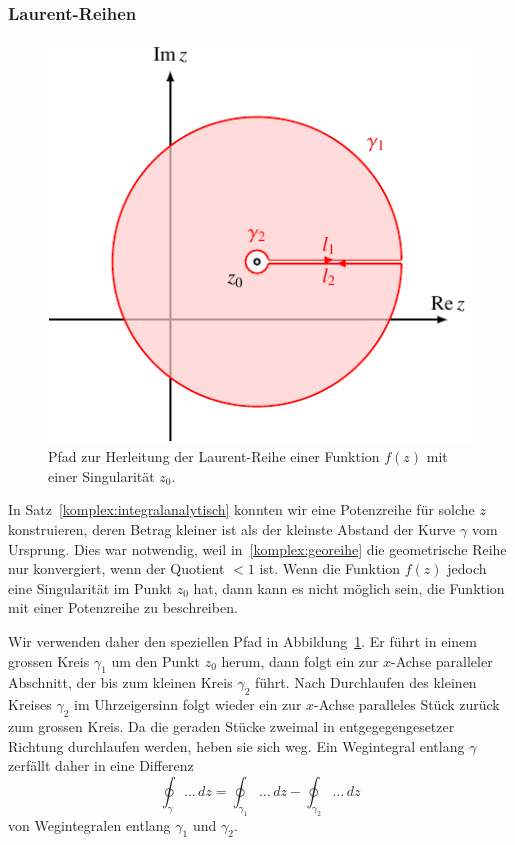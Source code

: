 \subsubsection{Laurent-Reihen}
\label{sssec:LaurentReihen}
\begin{figure}
\centering
\includegraphics{chapters/080-funktionentheorie/images/laurent.pdf}
\caption{Pfad zur Herleitung der Laurent-Reihe einer Funktion $f(z)$
mit einer Singularität $z_0$.
\label{komplex:laurentpfad}}
\end{figure}%
%
In Satz~\ref{komplex:integralanalytisch} konnten wir eine Potenzreihe für
solche $z$ konstruieren, deren Betrag kleiner ist als der kleinste Abstand
der Kurve $\gamma$ vom Ursprung.
Dies war notwendig, weil in~\eqref{komplex:georeihe} die geometrische Reihe
nur konvergiert, wenn der Quotient $<1$ ist.
Wenn die Funktion $f(z)$ jedoch eine Singularität im Punkt $z_0$ hat, dann
kann es nicht möglich sein, die Funktion mit einer Potenzreihe zu
beschreiben.

Wir verwenden daher den speziellen Pfad in Abbildung~\ref{komplex:laurentpfad}.
Er führt in einem grossen Kreis $\gamma_1$ um den Punkt $z_0$ herum,
dann folgt ein zur $x$-Achse paralleler Abschnitt, der bis zum kleinen
Kreis $\gamma_2$ führt.
Nach Durchlaufen des kleinen Kreises $\gamma_2$ im Uhrzeigersinn folgt wieder
ein zur $x$-Achse paralleles Stück zurück zum grossen Kreis.
Da die geraden Stücke zweimal in entgegegengesetzer Richtung durchlaufen
werden, heben sie sich weg.
Ein Wegintegral entlang $\gamma$ zerfällt daher in eine Differenz
\[
\oint_\gamma\dots\,dz
=
\oint_{\gamma_1}\dots\,dz
-
\oint_{\gamma_2}\dots\,dz
\]
von Wegintegralen entlang $\gamma_1$ und $\gamma_2$.

